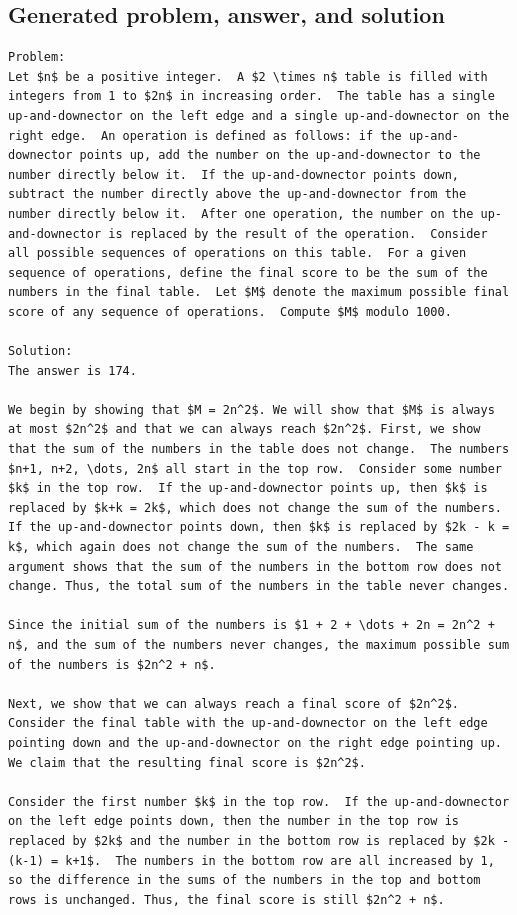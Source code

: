 \documentclass[11pt]{article}
\begin{document}
\subsection*{Generated problem, answer, and solution}
\begin{lstlisting}[style=modeloutput]
Problem:
Let $n$ be a positive integer.  A $2 \times n$ table is filled with integers from 1 to $2n$ in increasing order.  The table has a single up-and-downector on the left edge and a single up-and-downector on the right edge.  An operation is defined as follows: if the up-and-downector points up, add the number on the up-and-downector to the number directly below it.  If the up-and-downector points down, subtract the number directly above the up-and-downector from the number directly below it.  After one operation, the number on the up-and-downector is replaced by the result of the operation.  Consider all possible sequences of operations on this table.  For a given sequence of operations, define the final score to be the sum of the numbers in the final table.  Let $M$ denote the maximum possible final score of any sequence of operations.  Compute $M$ modulo 1000.

Solution:
The answer is 174.

We begin by showing that $M = 2n^2$. We will show that $M$ is always at most $2n^2$ and that we can always reach $2n^2$. First, we show that the sum of the numbers in the table does not change.  The numbers $n+1, n+2, \dots, 2n$ all start in the top row.  Consider some number $k$ in the top row.  If the up-and-downector points up, then $k$ is replaced by $k+k = 2k$, which does not change the sum of the numbers.  If the up-and-downector points down, then $k$ is replaced by $2k - k = k$, which again does not change the sum of the numbers.  The same argument shows that the sum of the numbers in the bottom row does not change. Thus, the total sum of the numbers in the table never changes.

Since the initial sum of the numbers is $1 + 2 + \dots + 2n = 2n^2 + n$, and the sum of the numbers never changes, the maximum possible sum of the numbers is $2n^2 + n$.

Next, we show that we can always reach a final score of $2n^2$. Consider the final table with the up-and-downector on the left edge pointing down and the up-and-downector on the right edge pointing up.  We claim that the resulting final score is $2n^2$.

Consider the first number $k$ in the top row.  If the up-and-downector on the left edge points down, then the number in the top row is replaced by $2k$ and the number in the bottom row is replaced by $2k - (k-1) = k+1$.  The numbers in the bottom row are all increased by 1, so the difference in the sums of the numbers in the top and bottom rows is unchanged. Thus, the final score is still $2n^2 + n$.


\end{lstlisting}
\end{document}
